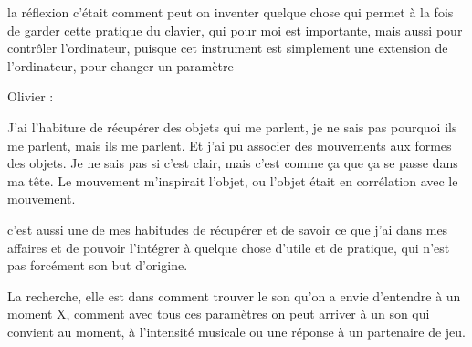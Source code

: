 la réflexion c'était comment peut on inventer quelque chose qui permet à la fois de garder cette pratique du clavier, qui pour moi est importante, mais aussi pour contrôler l'ordinateur, puisque cet instrument est simplement une extension de l'ordinateur, pour changer un paramètre


Olivier :

J'ai l'habiture de récupérer des objets qui me parlent, je ne sais pas pourquoi ils me parlent, mais ils me parlent. Et j'ai pu associer des mouvements aux formes des objets. Je ne sais pas si c'est clair, mais c'est comme ça que ça se passe dans ma tête.
Le mouvement m'inspirait l'objet, ou l'objet était en corrélation avec le mouvement.

c'est aussi une de mes habitudes de récupérer et de savoir ce que j'ai dans mes affaires et de pouvoir l'intégrer à quelque chose d'utile et de pratique, qui n'est pas forcément son but d'origine.



La recherche, elle est dans comment trouver le son qu'on a envie d'entendre à un moment X, comment avec tous ces paramètres on peut arriver à un son qui convient au moment, à l'intensité musicale ou une réponse à un partenaire de jeu.